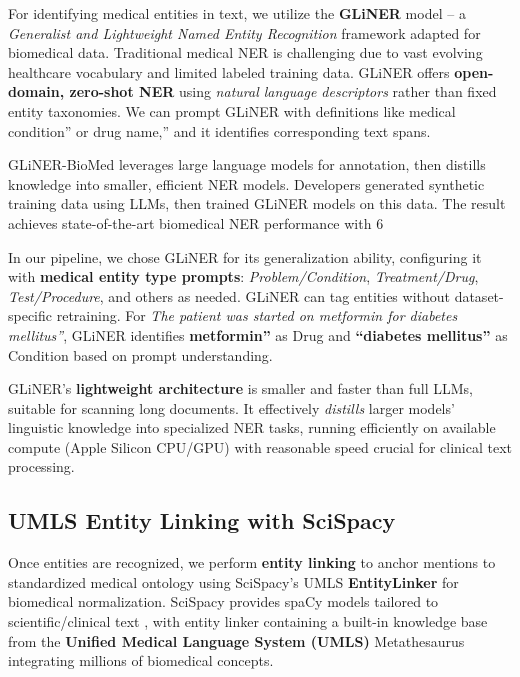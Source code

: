 For identifying medical entities in text, we utilize the \textbf{GLiNER} model – a \textit{Generalist and Lightweight Named Entity Recognition} framework adapted for biomedical data. Traditional medical NER is challenging due to vast evolving healthcare vocabulary and limited labeled training data. GLiNER offers \textbf{open-domain, zero-shot NER} using \textit{natural language descriptors} rather than fixed entity taxonomies. We can prompt GLiNER with definitions like medical condition'' or drug name,'' and it identifies corresponding text spans.

GLiNER-BioMed leverages large language models for annotation, then distills knowledge into smaller, efficient NER models. Developers generated synthetic training data using LLMs, then trained GLiNER models on this data. The result achieves state-of-the-art biomedical NER performance with 6%

In our pipeline, we chose GLiNER for its generalization ability, configuring it with \textbf{medical entity type prompts}: \textit{Problem/Condition}, \textit{Treatment/Drug}, \textit{Test/Procedure}, and others as needed. GLiNER can tag entities without dataset-specific retraining. For \textit{The patient was started on metformin for diabetes mellitus''}, GLiNER identifies \textbf{metformin''} as Drug and \textbf{``diabetes mellitus''} as Condition based on prompt understanding.

GLiNER's \textbf{lightweight architecture} is smaller and faster than full LLMs, suitable for scanning long documents. It effectively \textit{distills} larger models' linguistic knowledge into specialized NER tasks, running efficiently on available compute (Apple Silicon CPU/GPU) with reasonable speed crucial for clinical text processing.

\subsection{UMLS Entity Linking with SciSpacy}
\label{sec:entitylinking}

Once entities are recognized, we perform \textbf{entity linking} to anchor mentions to standardized medical ontology using SciSpacy's UMLS \textbf{EntityLinker} for biomedical normalization. SciSpacy provides spaCy models tailored to scientific/clinical text \parencite{Neumann2019}, with entity linker containing a built-in knowledge base from the \textbf{Unified Medical Language System (UMLS)} Metathesaurus integrating millions of biomedical concepts.

